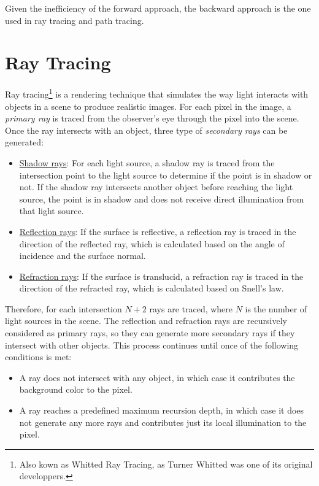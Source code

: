 Given the inefficiency of the forward approach, the backward approach is the one used in ray tracing and path tracing.


\section{Ray Tracing}

Ray tracing\footnote{Also kown as Whitted Ray Tracing, as Turner Whitted was one of its original developpers.} is a rendering technique that simulates the way light interacts with objects in a scene to produce realistic images. For each pixel in the image, a \emph{primary ray} is traced from the observer's eye through the pixel into the scene. Once the ray intersects with an object, three type of \emph{secondary rays} can be generated:
\begin{itemize}
    \item \ul{Shadow rays}: For each light source, a shadow ray is traced from the intersection point to the light source to determine if the point is in shadow or not. If the shadow ray intersects another object before reaching the light source, the point is in shadow and does not receive direct illumination from that light source.
    \item \ul{Reflection rays}: If the surface is reflective, a reflection ray is traced in the direction of the reflected ray, which is calculated based on the angle of incidence and the surface normal.
    \item \ul{Refraction rays}: If the surface is translucid, a refraction ray is traced in the direction of the refracted ray, which is calculated based on Snell's law.
\end{itemize}

Therefore, for each intersection $N+2$ rays are traced, where $N$ is the number of light sources in the scene. The reflection and refraction rays are recursively considered as primary rays, so they can generate more secondary rays if they intersect with other objects. This process continues until once of the following conditions is met:
\begin{itemize}
    \item A ray does not intersect with any object, in which case it contributes the background color to the pixel.
    \item A ray reaches a predefined maximum recursion depth, in which case it does not generate any more rays and contributes just its local illumination to the pixel.
\end{itemize}

